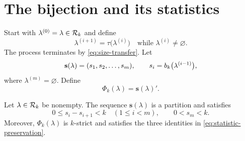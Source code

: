 \section{The bijection and its statistics}\label{sec:bijection}

Start with $\lambda^{(0)}=\lambda\in\mathcal{R}_k$ and define
\begin{equation}\label{eq:iterated-transfer}
 \lambda^{(i+1)}=\tau\bigl(\lambda^{(i)}\bigr)
 \quad\text{while }\lambda^{(i)}\ne\varnothing.
\end{equation}
The process terminates by \eqref{eq:size-transfer}. Let
\begin{equation}\label{eq:transfer-sequence}
 \mathbf{s}(\lambda)=(s_1,s_2,\ldots,s_m),
 \qquad s_i=b_k\bigl(\lambda^{(i-1)}\bigr),
\end{equation}
where $\lambda^{(m)}=\varnothing$. Define
\begin{equation}\label{eq:definition-phi}
 \Phi_k(\lambda)=\mathbf{s}(\lambda)'.
\end{equation}

\begin{proposition}\label{prop:sequence-properties}
Let $\lambda\in\mathcal{R}_k$ be nonempty. The sequence $\mathbf{s}(\lambda)$ is a
partition and satisfies
\begin{equation}\label{eq:gap-bound}
 0\leq s_i-s_{i+1}<k\quad(1\leq i<m),
 \qquad 0<s_m<k.
\end{equation}
Moreover, $\Phi_k(\lambda)$ is $k$-strict and satisfies the three identities
in \eqref{eq:statistic-preservation}.
\end{proposition}

